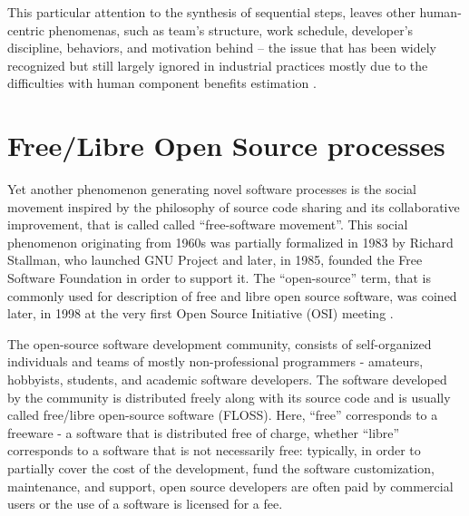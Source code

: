 This particular attention to the synthesis of sequential steps, leaves other human-centric phenomenas, 
such as team's structure, work schedule, developer's discipline, behaviors, and motivation behind -- 
the issue that has been widely recognized \cite{citeulike:149387} \cite{citeulike:113403} 
\cite{citeulike:205322} \cite{citeulike:12798652} but still largely ignored in industrial practices 
mostly due to the  difficulties with human component benefits estimation 
\cite{citeulike:12798659} \cite{citeulike:12798662} \cite{csdl2-12-11}.

%
%
\section{Free/Libre Open Source processes}\label{floss_processes}
Yet another phenomenon generating novel software processes is the social movement inspired by the philosophy 
of source code sharing and its collaborative improvement, that is called called ``free-software movement''. 
This social phenomenon originating from 1960s was partially formalized in 1983 by Richard Stallman,
who launched GNU Project and later, in 1985, founded the Free Software Foundation in order to support 
it. The ``open-source'' term, that is commonly used for description of free and libre open source software, 
was coined later, in 1998 at the very first Open Source Initiative (OSI) meeting \cite{osi-history}.

The open-source software development community, consists of self-organized individuals and teams of 
mostly non-professional programmers - amateurs, hobbyists, students, and academic software developers. 
The software developed by the community is distributed freely along with its source code and is 
usually called free/libre open-source software (FLOSS). Here, ``free'' corresponds to a freeware - 
a software that is distributed free of charge, whether ``libre'' corresponds to a software that is 
not necessarily free: typically, in order to partially cover the cost of the development, 
fund the software customization, maintenance, and support, open source developers are often paid 
by commercial users or the use of a software is licensed for a fee.


